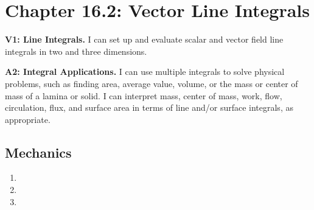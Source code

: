 \fancyhead[R]{\daytwentytwo}

\section*{\centering Chapter 16.2: Vector Line Integrals}

\textbf{V1: Line Integrals.} I can set up and evaluate scalar and vector field line integrals in two and three dimensions.

\textbf{A2: Integral Applications.}  I can use multiple integrals to solve physical problems, such as finding area, average value, volume, or the mass or center of mass of a lamina or solid. I can interpret mass, center of mass, work, flow, circulation, flux, and surface area in terms of line and/or surface integrals, as appropriate.

\subsection*{Mechanics}
\begin{enumerate}
    \item {}
        {%
        
        }
        {%
        
        }
    \item {}
        {%
        
        }
        {%
        
        }
    \item {}
        {%
        
        }
        {%
        
        }   
\end{enumerate}
